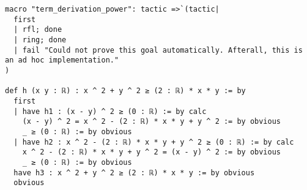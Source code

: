 \documentclass{article}
\begin{document}
\begin{tcolorbox}[colback=white!10, width=\linewidth]
\begin{lstlisting}[language=Lean4]
macro "term_derivation_power": tactic =>`(tactic|
  first
  | rfl; done
  | ring; done
  | fail "Could not prove this goal automatically. Afterall, this is an ad hoc implementation."
)

def h (x y : ℝ) : x ^ 2 + y ^ 2 ≥ (2 : ℝ) * x * y := by
  first
  | have h1 : (x - y) ^ 2 ≥ (0 : ℝ) := by calc
    (x - y) ^ 2 = x ^ 2 - (2 : ℝ) * x * y + y ^ 2 := by obvious
    _ ≥ (0 : ℝ) := by obvious
  | have h2 : x ^ 2 - (2 : ℝ) * x * y + y ^ 2 ≥ (0 : ℝ) := by calc
    x ^ 2 - (2 : ℝ) * x * y + y ^ 2 = (x - y) ^ 2 := by obvious
    _ ≥ (0 : ℝ) := by obvious
  have h3 : x ^ 2 + y ^ 2 ≥ (2 : ℝ) * x * y := by obvious
  obvious

\end{lstlisting}
\end{tcolorbox}
\end{document}
